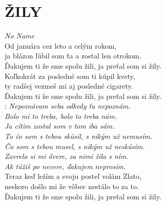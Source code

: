 \section*{\Huge ŽILY}
\emph{No Name}\\

Od januára cez leto a celým rokom,\\
ja blázon ľúbil som ťa a zostal len otrokom.\\
Ďakujem ti že sme spolu žili, ja preťal som si žily.\\

Koľkokrát za posledné som ti kúpil kvety,\\
ty radšej vezmeš mi aj posledné cigarety.\\
Ďakujem ti že sme spolu žili, ja preťal som si žily.\\

\textregistered:
\emph{Nepoznávam seba odkedy ťa nepoznám.\\
Bolo mi to treba, bolo to treba nám.\\
Ja cítim zostal som v tom iba sám.}\\

\emph{To čo som s tebou skúsil, s nikým už nemusím.\\
Čo som s tebou musel, s nikým už neskúsim.\\
Zavrela si mi dvere, za nimi žila s ním.\\
Ak túžiš po nevere, ďakujem neprosím.}\\

Teraz keď ležím a svoju posteľ volám Zlato,\\
neskoro došlo mi že vôbec nestálo to za to.\\
Ďakujem ti že sme spolu žili, ja preťal som si žily. \hspace{1cm} \textregistered

\newpage